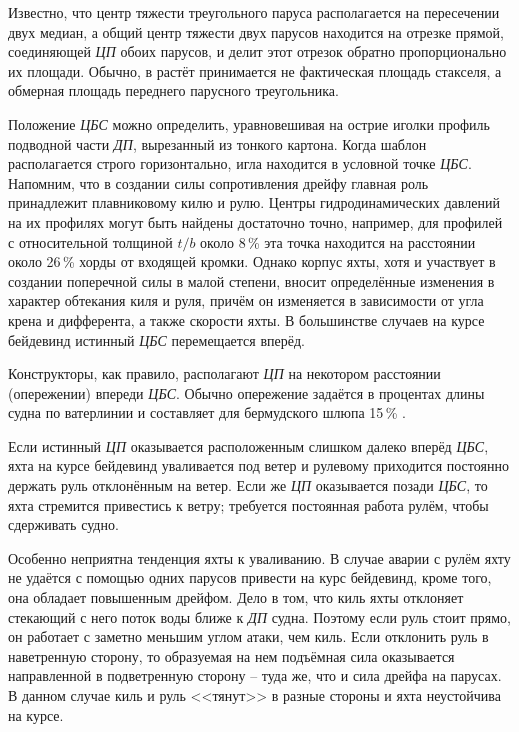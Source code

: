 Известно, что центр тяжести треугольного паруса располагается на
пересечении двух медиан, а общий центр тяжести двух парусов находится
на отрезке прямой, соединяющей \textit{ЦП} обоих парусов, и делит этот
отрезок обратно пропорционально их площади. Обычно, в растёт
принимается не фактическая площадь стакселя, а обмерная площадь
переднего парусного треугольника.

Положение \textit{ЦБС} можно определить, уравновешивая на острие
иголки профиль подводной части \textit{ДП}, вырезанный из тонкого
картона. Когда шаблон располагается строго горизонтально, игла
находится в условной точке \textit{ЦБС}. Напомним, что в создании силы
сопротивления дрейфу главная роль принадлежит плавниковому килю и
рулю. Центры гидродинамических давлений на их профилях могут быть
найдены достаточно точно, например, для профилей с относительной
толщиной $t/b$ около 8\,\% эта точка находится на расстоянии около
26\,\% хорды от входящей кромки. Однако корпус яхты, хотя и участвует
в создании поперечной силы в малой степени, вносит определённые
изменения в характер обтекания киля и руля, причём он изменяется в
зависимости от угла крена и дифферента, а также скорости яхты. В
большинстве случаев на курсе бейдевинд истинный \textit{ЦБС}
перемещается вперёд.

Конструкторы, как правило, располагают \textit{ЦП} на некотором
расстоянии (опережении) впереди \textit{ЦБС}. Обычно опережение
задаётся в процентах длины судна по ватерлинии и составляет для
бермудского шлюпа 15\,\% \lkvl.

Если истинный \textit{ЦП} оказывается расположенным слишком далеко
вперёд \textit{ЦБС}, яхта на курсе бейдевинд уваливается под ветер и
рулевому приходится постоянно держать руль отклонённым на ветер. Если
же \textit{ЦП} оказывается позади \textit{ЦБС}, то яхта стремится
привестись к ветру; требуется постоянная работа рулём, чтобы
сдерживать судно.

Особенно неприятна тенденция яхты к уваливанию. В случае аварии с
рулём яхту не удаётся с помощью одних парусов привести на курс
бейдевинд, кроме того, она обладает повышенным дрейфом. Дело в том,
что киль яхты отклоняет стекающий с него поток воды ближе к
\textit{ДП} судна. Поэтому если руль стоит прямо, он работает с
заметно меньшим углом атаки, чем киль. Если отклонить руль в
наветренную сторону, то образуемая на нем подъёмная сила оказывается
направленной в подветренную сторону \--- туда же, что и сила дрейфа на
парусах. В данном случае киль и руль <<тянут>> в разные стороны и яхта
неустойчива на курсе.


